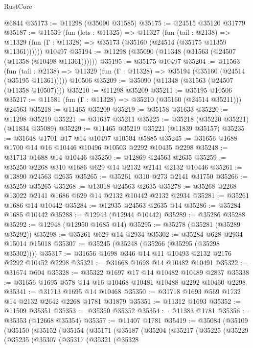 \begin{lexlean}{RustCore}
\begin{coremodule}
    @6844
@35173 := @11298 (@35090 @31585)
@35175 := @24515 @35120 @31779
@35187 := @11539
    (fun (lets : @11325) =>
    @11327
      (fun (tail : @2138) =>
      @11329 (fun (Γ : @11328) => @35173 (@35160 (@24514 (@35175 @11359 @11361))))))
    @10497
@35194 := @11298 (@35090 (@11348 (@31563 (@24507 (@11358 (@10498 @11361))))))
@35195 := @35175 @10497
@35204 := @11563
    (fun (tail : @2138) => @11329 (fun (Γ : @11328) => @35194 (@35160 (@24514 (@35195 @11361)))))
    @10506
@35209 := @35090 (@11348 (@31563 (@24507 (@11358 @10507))))
@35210 := @11298 @35209
@35211 := @35195 @10506
@35217 := @11581 (fun (Γ : @11328) => @35210 (@35160 (@24514 @35211))) @24563
@35218 := @11465 @35209
@35219 := @35158 @31633
@35220 := @11298 @35219
@35221 := @31637 @35211
@35225 := @35218 (@35220 @35221) (@11834 @35089)
@35229 := @11465 @35219 @35221 (@11839 @35157)
@35235 := @31648 @1701 @17 @14 @10497 @10504 @5885
@35245 := @31656 @1688 @1700 @14 @16 @10446 @10496 @10503 @2292 @10435 @2298
@35248 := @31713 @1688 @14 @10446
@35250 := @12869 @24563 @2635
@35259 := @35250 @2268 @310 @1686 @629 @14 @2132 @2141 @2132 @10446
@35261 := @13890 @24563 @2635
@35265 := @35261 @310 @273 @2141 @31750
@35266 := @35259 @35265
@35268 := @13018 @24563 @2635
@35278 := @35268 @2268 @13022 @2141 @1686 @629 @14 @2132 @10442 @2132 @2934
@35281 := @35261 @1686 @14 @10442
@35284 := @12935 @24563 @2635 @14
@35286 := @35284 @1685 @10442
@35288 := @12943 (@12944 @10442)
@35289 := @35286 @35288
@35292 := @12948 (@12950 @1685 @14)
@35295 := @35278 (@35281 (@35289 @35292))
@35298 := @35261 @629 @14 @2934
@35302 := @35284 @628 @2934 @15014 @15018
@35307 := @35245 (@35248 (@35266 (@35295 (@35298 @35302))))
@35317 := @31656 @1698 @346 @14 @11 @10493 @2132 @2176 @2292 @10452 @2298
@35321 := @31668 @1698 @14 @10482 @10491
@35322 := @31674 @604
@35328 := @35322 @1697 @17 @14 @10482 @10489 @2837
@35338 := @31656 @1695 @578 @14 @16 @10468 @10481 @10488 @2292 @10460 @2298
@35341 := @31713 @1695 @14 @10468
@35350 := @31718 @1693 @569 @1732 @14 @2132 @2642 @2268 @1781 @31879
@35351 := @11312 @1693
@35352 := @11509 @35351
@35353 := @35350 @35352
@35354 := @11383 @1781
@35356 := @35353 (@12668 @35354)
@35357 := @11407 @1781
@35419 := @35084
    (@35109
      (@35150
        (@35152
          (@35154
            (@35171
              (@35187
                (@35204
                  (@35217
                    (@35225
                      (@35229
                        (@35235
                          (@35307
                            (@35317
                              (@35321
                                (@35328

\end{coremodule}
\end{lexlean}
